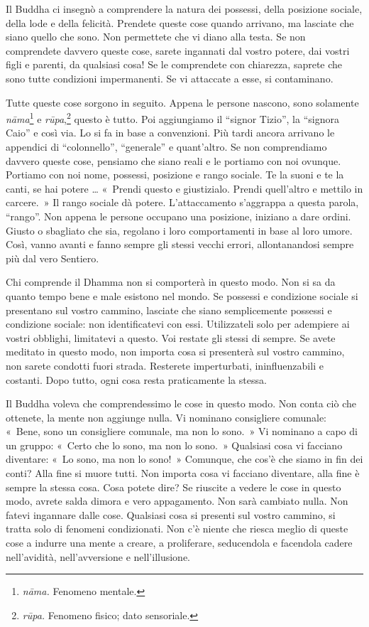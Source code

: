 Il Buddha ci insegnò a comprendere la natura dei possessi, della
posizione sociale, della lode e della felicità. Prendete queste cose
quando arrivano, ma lasciate che siano quello che sono. Non permettete
che vi diano alla testa. Se non comprendete davvero queste cose, sarete
ingannati dal vostro potere, dai vostri figli e parenti, da qualsiasi
cosa! Se le comprendete con chiarezza, saprete che sono tutte condizioni
impermanenti. Se vi attaccate a esse, si contaminano.

Tutte queste cose sorgono in seguito. Appena le persone nascono, sono
solamente \emph{nāma}\footnote{\emph{nāma.} Fenomeno mentale.} e
\emph{rūpa},\footnote{\emph{rūpa.} Fenomeno fisico; dato sensoriale.}
questo è tutto. Poi aggiungiamo il ``signor Tizio'', la ``signora Caio''
e così via. Lo si fa in base a convenzioni. Più tardi ancora arrivano le
appendici di ``colonnello'', ``generale'' e quant'altro. Se non
comprendiamo davvero queste cose, pensiamo che siano reali e le portiamo
con noi ovunque. Portiamo con noi nome, possessi, posizione e rango
sociale. Te la suoni e te la canti, se hai potere \ldots{} «~Prendi questo e
giustizialo. Prendi quell'altro e mettilo in carcere.~» Il rango sociale
dà potere. L'attaccamento s'aggrappa a questa parola, ``rango''. Non
appena le persone occupano una posizione, iniziano a dare ordini. Giusto
o sbagliato che sia, regolano i loro comportamenti in base al loro
umore. Così, vanno avanti e fanno sempre gli stessi vecchi errori,
allontanandosi sempre più dal vero Sentiero.

Chi comprende il Dhamma non si comporterà in questo modo. Non si sa da
quanto tempo bene e male esistono nel mondo. Se possessi e condizione
sociale si presentano sul vostro cammino, lasciate che siano
semplicemente possessi e condizione sociale: non identificatevi con
essi. Utilizzateli solo per adempiere ai vostri obblighi, limitatevi a
questo. Voi restate gli stessi di sempre. Se avete meditato in questo
modo, non importa cosa si presenterà sul vostro cammino, non sarete
condotti fuori strada. Resterete imperturbati, ininfluenzabili e
costanti. Dopo tutto, ogni cosa resta praticamente la stessa.

Il Buddha voleva che comprendessimo le cose in questo modo. Non conta
ciò che ottenete, la mente non aggiunge nulla. Vi nominano consigliere
comunale: «~Bene, sono un consigliere comunale, ma non lo sono.~» Vi
nominano a capo di un gruppo: «~Certo che lo sono, ma non lo sono.~»
Qualsiasi cosa vi facciano diventare: «~Lo sono, ma non lo sono!~»
Comunque, che cos'è che siamo in fin dei conti? Alla fine si muore
tutti. Non importa cosa vi facciano diventare, alla fine è sempre la
stessa cosa. Cosa potete dire? Se riuscite a vedere le cose in questo
modo, avrete salda dimora e vero appagamento. Non sarà cambiato nulla.
Non fatevi ingannare dalle cose. Qualsiasi cosa si presenti sul vostro
cammino, si tratta solo di fenomeni condizionati. Non c'è niente che
riesca meglio di queste cose a indurre una mente a creare, a
proliferare, seducendola e facendola cadere nell'avidità,
nell'avversione e nell'illusione.

